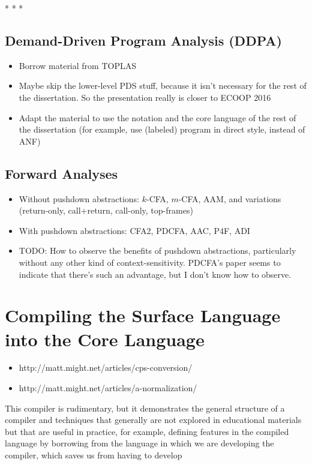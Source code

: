 \documentclass[12pt, oneside]{book}
\begin{document}
* * *

\section{Demand-Driven Program Analysis (DDPA)}

\begin{itemize}
  \item Borrow material from TOPLAS
  \item Maybe skip the lower-level PDS stuff, because it isn’t necessary for the rest of the dissertation. So the presentation really is closer to ECOOP 2016
  \item Adapt the material to use the notation and the core language of the rest of the dissertation (for example, use (labeled) program in direct style, instead of ANF)
\end{itemize}

\section{Forward Analyses}

\begin{itemize}
  \item Without pushdown abstractions: \(k\)-CFA, \(m\)-CFA, AAM, and variations (return-only, call+return, call-only, top-frames)
  \item With pushdown abstractions: CFA2, PDCFA, AAC, P4F, ADI
  \item TODO: How to observe the benefits of pushdown abstractions, particularly without any other kind of context-sensitivity. PDCFA’s paper seems to indicate that there’s such an advantage, but I don’t know how to observe.
\end{itemize}

\appendix

\chapter{Compiling the Surface Language into the Core Language}
\label{section:compiling-the-surface-language-into-the-core-language}

\begin{itemize}
  \item http://matt.might.net/articles/cps-conversion/
  \item http://matt.might.net/articles/a-normalization/
\end{itemize}

This compiler is rudimentary, but it demonstrates the general structure of a compiler and techniques that generally are not explored in educational materials but that are useful in practice, for example, defining features in the compiled language by borrowing from the language in which we are developing the compiler, which saves us from having to develop 
\end{document}
